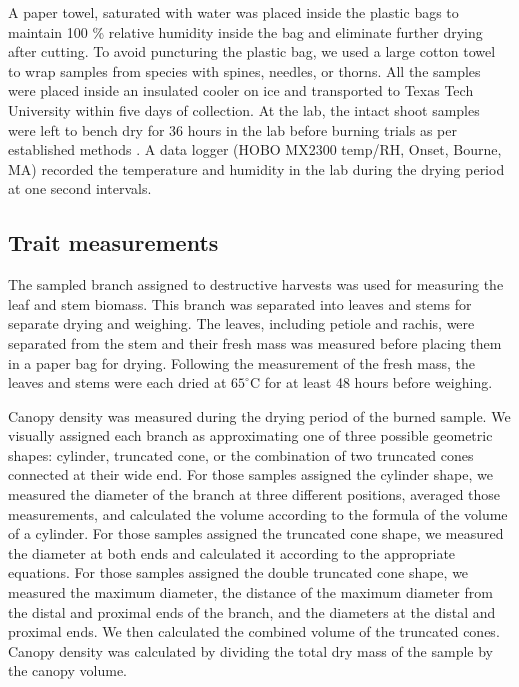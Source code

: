 \documentclass{ttuthes2007}
\begin{document}
\noindent A paper towel, saturated with water was placed inside the plastic bags to maintain 100 \% relative humidity inside the bag and eliminate further drying after cutting. To avoid puncturing the plastic bag, we used a large cotton towel to wrap samples from species with spines, needles, or thorns. All the samples were placed inside an insulated cooler on ice and transported to Texas Tech University within five days of collection.  %
At the lab, the intact shoot samples were left to bench dry for 36 hours in the lab before burning trials  as per established methods \citep{wyse2016quantitative}. 
A data logger (HOBO MX2300 temp/RH, Onset, Bourne, MA) recorded the temperature and humidity in the lab during the drying period at one second intervals.



\subsection*{\textbf{Trait measurements}}

\noindent The sampled branch assigned to destructive harvests was used for measuring the leaf and stem biomass.
This branch was separated into leaves and stems for separate drying and weighing. The leaves, including petiole and rachis, were separated from the stem and their fresh mass was measured before placing them in a paper bag for drying. Following the measurement of the fresh mass, the leaves and stems were each dried at $65^{\circ}$C for at least 48 hours before weighing.

\noindent Canopy density was measured during the drying period of the burned sample. We visually assigned each branch as approximating one of three possible geometric shapes: cylinder, truncated cone, or the combination of two truncated cones connected at their wide end. For those samples assigned the cylinder shape, we measured the diameter of the branch at three different positions, averaged those measurements, and calculated the volume according to the formula of the volume of a cylinder. For those samples assigned the truncated cone shape, we measured the diameter at both ends and calculated it according to the appropriate equations. For those samples assigned the double truncated cone shape, we measured the maximum diameter, the distance of the maximum diameter from the distal and proximal ends of the branch, and the diameters at the distal and proximal ends. We then calculated the combined volume of the truncated cones. Canopy density was calculated by dividing the total dry mass of the sample by the canopy volume.
\end{document}
